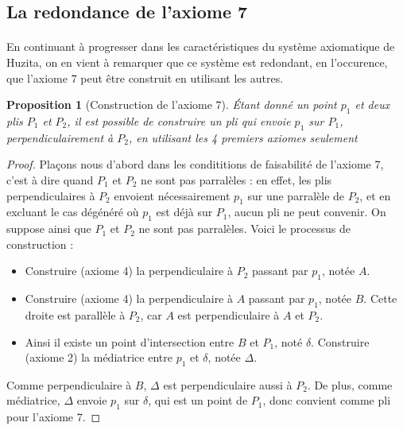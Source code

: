 \documentclass[a4paper,12pt,french]{report}
\newtheorem{proposition}{Proposition}[section]
\begin{document}
\subsection{La redondance de l'axiome 7}
		
		\paragraph{} En continuant à progresser dans les caractéristiques du système axiomatique de Huzita, on en vient à remarquer que ce système est redondant, en l'occurence, que l'axiome 7 peut être construit en utilisant les autres.
		
		\begin{proposition}[Construction de l'axiome 7]
			Étant donné un point $p_{1}$ et deux plis $P_{1}$ et $P_{2}$, il est possible de construire un pli qui envoie $p_{1}$ sur $P_{1}$, perpendiculairement à $P_{2}$, en utilisant les 4 premiers axiomes seulement
		\end{proposition}
		
		
		\begin{proof}
			Plaçons nous d'abord dans les condititions de faisabilité de l'axiome 7, c'est à dire quand $P_{1}$ et $P_{2}$ ne sont pas parralèles : en effet, les plis perpendiculaires à $P_{2}$ envoient nécessairement $p_{1}$ sur une parralèle de $P_{2}$, et en excluant le cas dégénéré où $p_{1}$ est déjà sur $P_{1}$, aucun pli ne peut convenir. On suppose ainsi que $P_{1}$ et $P_{2}$ ne sont pas parralèles. Voici le processus de construction : 
			\begin{itemize}
				\item Construire (axiome 4) la perpendiculaire à $P_{2}$ passant par $p_{1}$, notée $A$.
				\item Construire (axiome 4) la perpendiculaire à $A$ passant par $p_{1}$, notée $B$. Cette droite est parallèle à $P_{2}$, car $A$ est perpendiculaire à $A$ et $P_{2}$.
				\item Ainsi il existe un point d'intersection entre $B$ et $P_{1}$, noté $\delta$. Construire (axiome 2) la médiatrice entre $p_{1}$ et $\delta$, notée $\Delta$.
			\end{itemize}
			Comme perpendiculaire à $B$, $\Delta$ est perpendiculaire aussi à $P_{2}$. De plus, comme médiatrice, $\Delta$ envoie $p_{1}$ sur $\delta$, qui est un point de $P_{1}$, donc convient comme pli pour l'axiome 7.
		\end{proof}
		
\end{document}
